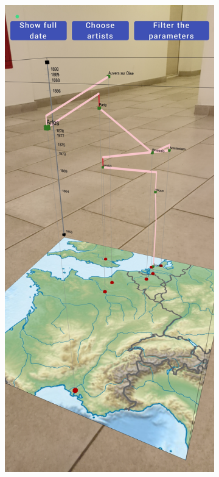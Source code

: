 \begin{figure}[hbt!]
    \centering
    \begin{subfigure}{.5\textwidth}
        \centering
        \includegraphics[width=0.7\linewidth]{graphics/3-implementation/ar1}
    \end{subfigure}%
    \begin{subfigure}{.5\textwidth}
        \centering

\end{subfigure}
\end{figure}
